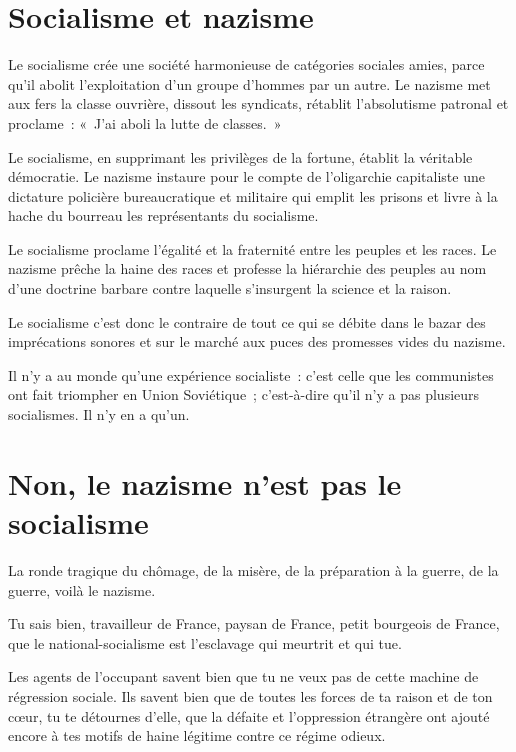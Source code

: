 \documentclass[french,twoside]{book} %
\begin{document}
\section[{Socialisme et nazisme}]{Socialisme et nazisme}
\noindent Le socialisme crée une société harmonieuse de catégories sociales amies, parce qu’il abolit l’exploitation d’un groupe d’hommes par un autre. Le nazisme met aux fers la classe ouvrière, dissout les syndicats, rétablit l’absolutisme patronal et proclame : « J’ai aboli la lutte de classes. »\par
Le socialisme, en supprimant les privilèges de la fortune, établit la véritable démocratie. Le nazisme instaure pour le compte de l’oligarchie capitaliste une dictature policière bureaucratique et militaire qui emplit les prisons et livre à la hache du bourreau les représentants du socialisme.\par
Le socialisme proclame l’égalité et la fraternité entre les peuples et les races. Le nazisme prêche la haine des races et professe la hiérarchie des peuples au nom d’une doctrine barbare contre laquelle s’insurgent la science et la raison.\par
Le socialisme c’est donc le contraire de tout ce qui se débite dans le bazar des imprécations sonores et sur le marché aux puces des promesses vides du nazisme.\par
Il n’y a au monde qu’une expérience socialiste : c’est celle que les communistes ont fait triompher en Union Soviétique ; c’est-à-dire qu’il n’y a pas plusieurs socialismes. Il n’y en a qu’un.
\section[{Non, le nazisme n’est pas le socialisme}]{Non, le nazisme n’est pas le socialisme}
\noindent La ronde tragique du chômage, de la misère, de la préparation à la guerre, de la guerre, voilà le nazisme.\par
Tu sais bien, travailleur de France, paysan de France, petit bourgeois de France, que le national-socialisme est l’esclavage qui meurtrit et qui tue.\par
Les agents de l’occupant savent bien que tu ne veux pas de cette machine de régression sociale. Ils savent bien que de toutes les forces de ta raison et de ton cœur, tu te détournes d’elle, que la défaite et l’oppression étrangère ont ajouté encore à tes motifs de haine légitime contre ce régime odieux.
\end{document}
